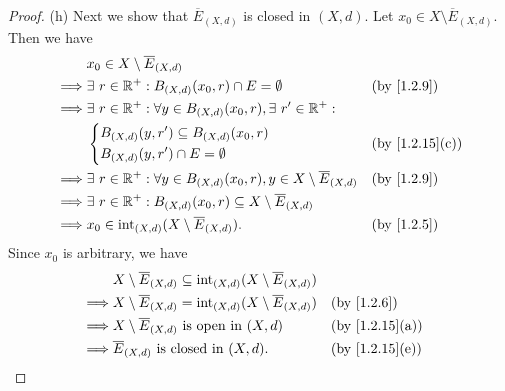 \begin{proof}{(h)}
  Next we show that \(\overline{E}_{(X, d)}\) is closed in \((X, d)\).
  Let \(x_0 \in X \setminus \overline{E}_{(X, d)}\).
  Then we have
  \begin{align*}
             & x_0 \in X \setminus \overline{E}_{(X, d)}                                                                                     \\
    \implies & \exists\ r \in \R^+ : B_{(X, d)}(x_0, r) \cap E = \emptyset                                     &  & \text{(by \cref{1.2.9})} \\
    \implies & \exists\ r \in \R^+ : \forall y \in B_{(X, d)}(x_0, r), \exists\ r' \in \R^+ :                                                \\
             & \begin{dcases}
                 B_{(X, d)}(y, r') \subseteq B_{(X, d)}(x_0, r) \\
                 B_{(X, d)}(y, r') \cap E = \emptyset
               \end{dcases}                                               &  & \text{(by \cref{1.2.15}(c))}                                  \\
    \implies & \exists\ r \in \R^+ : \forall y \in B_{(X, d)}(x_0, r), y \in X \setminus \overline{E}_{(X, d)} &  & \text{(by \cref{1.2.9})} \\
    \implies & \exists\ r \in \R^+ : B_{(X, d)}(x_0, r) \subseteq X \setminus \overline{E}_{(X, d)}                                          \\
    \implies & x_0 \in \text{int}_{(X, d)}(X \setminus \overline{E}_{(X, d)}).                                 &  & \text{(by \cref{1.2.5})}
  \end{align*}
  Since \(x_0\) is arbitrary, we have
  \begin{align*}
             & X \setminus \overline{E}_{(X, d)} \subseteq \text{int}_{(X, d)}(X \setminus \overline{E}_{(X, d)})                                   \\
    \implies & X \setminus \overline{E}_{(X, d)} = \text{int}_{(X, d)}(X \setminus \overline{E}_{(X, d)})         &  & \text{(by \cref{1.2.6})}     \\
    \implies & X \setminus \overline{E}_{(X, d)} \text{ is open in } (X, d)                                       &  & \text{(by \cref{1.2.15}(a))} \\
    \implies & \overline{E}_{(X, d)} \text{ is closed in } (X, d).                                                &  & \text{(by \cref{1.2.15}(e))}
  \end{align*}


\end{proof}
